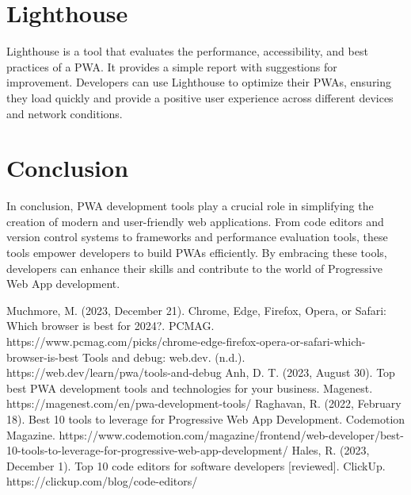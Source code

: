 \documentclass[conference]{IEEEtran}
\begin{document}
\section{Lighthouse}
Lighthouse is a tool that evaluates the performance, accessibility, and best practices of a PWA. It provides a simple report with suggestions for improvement. Developers can use Lighthouse to optimize their PWAs, ensuring they load quickly and provide a positive user experience across different devices and network conditions.
\section*{Conclusion}
In conclusion, PWA development tools play a crucial role in simplifying the creation of modern and user-friendly web applications. From code editors and version control systems to frameworks and performance evaluation tools, these tools empower developers to build PWAs efficiently. By embracing these tools, developers can enhance their skills and contribute to the world of Progressive Web App development.
\begin{thebibliography}{00}
 Muchmore, M. (2023, December 21). Chrome, Edge, Firefox, Opera, or Safari: Which browser is best for 2024?. PCMAG. https://www.pcmag.com/picks/chrome-edge-firefox-opera-or-safari-which-browser-is-best
 Tools and debug: web.dev. (n.d.). https://web.dev/learn/pwa/tools-and-debug 
 Anh, D. T. (2023, August 30). Top best PWA development tools and technologies for your business. Magenest. https://magenest.com/en/pwa-development-tools/ 
 Raghavan, R. (2022, February 18). Best 10 tools to leverage for Progressive Web App Development. Codemotion Magazine. https://www.codemotion.com/magazine/frontend/web-developer/best-10-tools-to-leverage-for-progressive-web-app-development/
 Hales, R. (2023, December 1). Top 10 code editors for software developers [reviewed]. ClickUp. https://clickup.com/blog/code-editors/ 
\end{thebibliography}
\end{document}
